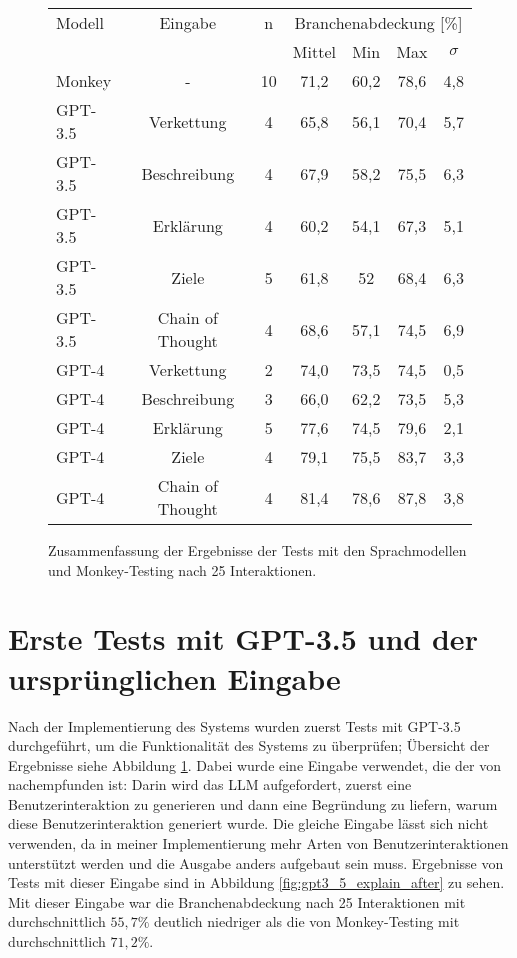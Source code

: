 \begin{figure}
    \centering
    \begin{tabular}{|l|c|c|c|c|c|c|}
        \hline
        Modell & Eingabe & n & \multicolumn{4}{c|}{Branchenabdeckung [\%]}  \\
         &  &  & Mittel & Min & Max & $\sigma$ \\
        \hline
        Monkey & - & 10 & 71,2 & 60,2 & 78,6 & 4,8 \\
        GPT-3.5 & Verkettung & 4 & 65,8 & 56,1 & 70,4 & 5,7 \\
        GPT-3.5 & Beschreibung & 4 & 67,9 & 58,2 & 75,5 & 6,3 \\
        GPT-3.5 & Erklärung & 4 & 60,2 & 54,1 & 67,3 & 5,1 \\
        GPT-3.5 & Ziele & 5 & 61,8 & 52 & 68,4 & 6,3 \\
        GPT-3.5 & Chain of Thought & 4 & 68,6 & 57,1 & 74,5 & 6,9 \\
        GPT-4 & Verkettung & 2 & 74,0 & 73,5 & 74,5 & 0,5 \\
        GPT-4 & Beschreibung & 3 & 66,0 & 62,2 & 73,5 & 5,3 \\
        GPT-4 & Erklärung & 5 & 77,6 & 74,5 & 79,6 & 2,1 \\
        GPT-4 & Ziele & 4 & 79,1 & 75,5 & 83,7 & 3,3 \\
        GPT-4 & Chain of Thought & 4 & 81,4 & 78,6 & 87,8 & 3,8 \\
        \hline
    \end{tabular}
    \caption{Zusammenfassung der Ergebnisse der Tests mit den Sprachmodellen und Monkey-Testing nach 25 Interaktionen.}
    \label{tab:results}
\end{figure}



\section{Erste Tests mit GPT-3.5 und der ursprünglichen Eingabe}

Nach der Implementierung des Systems wurden zuerst Tests mit GPT-3.5 durchgeführt, um die Funktionalität des Systems zu überprüfen; Übersicht der Ergebnisse siehe Abbildung \ref{tab:results}.
Dabei wurde eine Eingabe verwendet, die der von  nachempfunden ist:
Darin wird das LLM aufgefordert, zuerst eine Benutzerinteraktion zu generieren und dann eine Begründung zu liefern, warum diese Benutzerinteraktion generiert wurde.
Die gleiche Eingabe lässt sich nicht verwenden, da in meiner Implementierung mehr Arten von Benutzerinteraktionen unterstützt werden und die Ausgabe anders aufgebaut sein muss.
Ergebnisse von Tests mit dieser Eingabe sind in Abbildung \ref{fig:gpt3_5_explain_after} zu sehen.
Mit dieser Eingabe war die Branchenabdeckung nach 25 Interaktionen mit durchschnittlich $55{,}7\%$ deutlich niedriger als die von Monkey-Testing mit durchschnittlich $71{,}2\%$.

